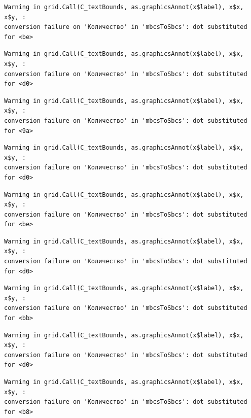 \documentclass[
  letterpaper,
]{scrbook}
\theoremstyle{definition}
\theoremstyle{remark}
\begin{document}
\begin{verbatim}
Warning in grid.Call(C_textBounds, as.graphicsAnnot(x$label), x$x, x$y, :
conversion failure on 'Количество' in 'mbcsToSbcs': dot substituted for <be>
\end{verbatim}

\begin{verbatim}
Warning in grid.Call(C_textBounds, as.graphicsAnnot(x$label), x$x, x$y, :
conversion failure on 'Количество' in 'mbcsToSbcs': dot substituted for <d0>
\end{verbatim}

\begin{verbatim}
Warning in grid.Call(C_textBounds, as.graphicsAnnot(x$label), x$x, x$y, :
conversion failure on 'Количество' in 'mbcsToSbcs': dot substituted for <9a>
\end{verbatim}

\begin{verbatim}
Warning in grid.Call(C_textBounds, as.graphicsAnnot(x$label), x$x, x$y, :
conversion failure on 'Количество' in 'mbcsToSbcs': dot substituted for <d0>
\end{verbatim}

\begin{verbatim}
Warning in grid.Call(C_textBounds, as.graphicsAnnot(x$label), x$x, x$y, :
conversion failure on 'Количество' in 'mbcsToSbcs': dot substituted for <be>
\end{verbatim}

\begin{verbatim}
Warning in grid.Call(C_textBounds, as.graphicsAnnot(x$label), x$x, x$y, :
conversion failure on 'Количество' in 'mbcsToSbcs': dot substituted for <d0>
\end{verbatim}

\begin{verbatim}
Warning in grid.Call(C_textBounds, as.graphicsAnnot(x$label), x$x, x$y, :
conversion failure on 'Количество' in 'mbcsToSbcs': dot substituted for <bb>
\end{verbatim}

\begin{verbatim}
Warning in grid.Call(C_textBounds, as.graphicsAnnot(x$label), x$x, x$y, :
conversion failure on 'Количество' in 'mbcsToSbcs': dot substituted for <d0>
\end{verbatim}

\begin{verbatim}
Warning in grid.Call(C_textBounds, as.graphicsAnnot(x$label), x$x, x$y, :
conversion failure on 'Количество' in 'mbcsToSbcs': dot substituted for <b8>
\end{verbatim}
\end{document}
